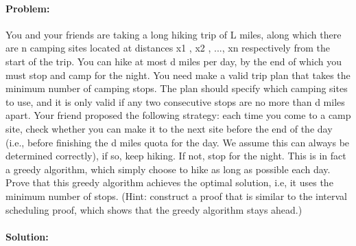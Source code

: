 \documentclass[12pt]{article}
\begin{document}
\paragraph{Problem:}
You and your friends are taking a long hiking trip of L miles, along
which there are n camping sites located at distances x1 , x2 , ..., xn
respectively from the start of the trip. You can hike at most d miles
per day, by the end of which you must stop and camp for the night. You
need make a valid trip plan that takes the minimum number of camping
stops. The plan should specify which camping sites to use, and it is
only valid if any two consecutive stops are no more than d miles apart.
Your friend proposed the following strategy: each time you come to a
camp site, check whether you can make it to the next site before the end
of the day (i.e., before finishing the d miles quota for the day. We
assume this can always be determined correctly), if so, keep hiking. If
not, stop for the night.  This is in fact a greedy algorithm, which
simply choose to hike as long as possible each day. Prove that this
greedy algorithm achieves the optimal solution, i.e, it uses the minimum
number of stops. (Hint: construct a proof that is similar to the
interval scheduling proof, which shows that the greedy algorithm stays
ahead.)

\paragraph{Solution:}
\end{document}
